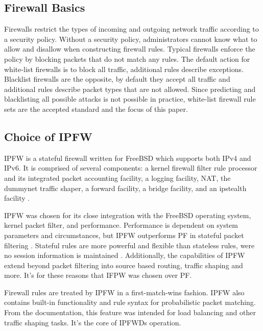 \documentclass[journal]{IEEEtran}
\begin{document}
  \subsection{Firewall Basics}

    Firewalls restrict the types of incoming and outgoing network traffic
    according to a security policy. Without a security policy, administrators
    cannot know what to allow and disallow when constructing firewall rules.
    Typical firewalls enforce the policy by blocking packets that do not match
    any rules. The default action for white-list firewalls is to block all
    traffic, additional rules describe exceptions. Blacklist firewalls are the
    opposite, by default they accept all traffic and additional rules describe
    packet types that are not allowed. Since predicting and blacklisting all
    possible attacks is not possible in practice, white-list firewall rule sets
    are the accepted standard and the focus of this paper.

  \subsection{Choice of IPFW}

    IPFW is a stateful firewall written for FreeBSD which supports both IPv4
    and IPv6. It is comprised of several components: a kernel firewall filter
    rule processor and its integrated packet accounting facility, a logging
    facility, NAT, the dummynet traffic shaper, a forward facility, a bridge
    facility, and an ipstealth facility \cite{freebsdhandbook}.

    IPFW was chosen for its close integration with the FreeBSD operating
    system, kernel packet filter, and performance. Performance is dependent on
    system parameters and circumstances, but IPFW outperforms PF in stateful
    packet filtering \cite{ipfwvspf}. Stateful rules are more powerful and
    flexible than stateless rules, were no session information is maintained
    \cite{networksecurity}.  Additionally, the capabilities of IPFW extend
    beyond packet filtering into source based routing, traffic shaping and
    more. It's for these reasons that IFPW was chosen over PF.

    Firewall rules are treated by IPFW in a first-match-wins fashion. IPFW also
    contains built-in functionality and rule syntax for probabilistic packet
    matching. From the documentation, this feature was intended for load
    balancing and other traffic shaping tasks. It's the core of IPFWDs
    operation. 
\end{document}

